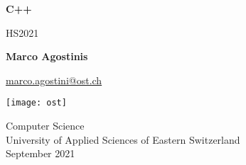\begin{titlepage}
    \begin{center}
        \vspace*{1cm}
            
        \Huge
        \textbf{C++}
            
        \vspace{0.5cm}
        \LARGE
        HS2021
            
        \vspace{1.5cm}
            
        \textbf{Marco Agostinis} 
        \vspace{0.25cm}
        
        \small\href{mailto:marco.agostini@ost.ch}{marco.agostini@ost.ch}
            
        \vfill
            
    
        \texttt{[image: ost]}
           
        \vspace{2cm}
           
        \Large
        Computer Science \\
        University of Applied Sciences of Eastern Switzerland \\
        September 2021
        

    \end{center}
\end{titlepage}

\pagebreak
